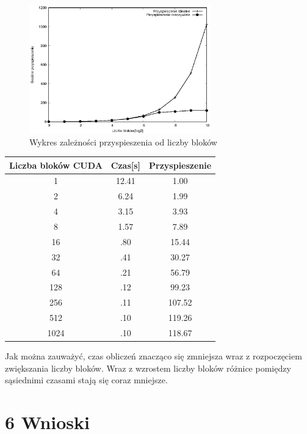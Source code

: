 \documentclass[a4paper,12pt]{article}
\begin{document}
\begin{figure}[!ht]
	\centering
  \includegraphics[width=0.7\textwidth]{cudaWykresPrzyspieszenie.eps}
  \caption{Wykres zależności przyspieszenia od liczby bloków}
\end{figure}

\newpage
\begin{table}[htb]
\centering
\begin{tabular}{|c|c|c|}\hline
Liczba bloków CUDA & Czas[s] & Przyspieszenie\\\hline 
1 & 12.41 & 1.00\\ \hline 
2 & 6.24 & 1.99\\ \hline 
4 & 3.15 & 3.93\\ \hline 
8 & 1.57 & 7.89\\ \hline 
16 & .80 & 15.44\\ \hline 
32 & .41 & 30.27\\ \hline 
64 & .21 & 56.79\\ \hline 
128 & .12 & 99.23\\ \hline
256 & .11 & 107.52\\ \hline 
512 & .10 & 119.26\\ \hline 
1024 & .10 & 118.67\\ \hline 
\end{tabular}
\end{table}
Jak można zauważyć, czas obliczeń znacząco się zmniejsza wraz z rozpoczęciem zwiększania liczby bloków. Wraz z wzrostem liczby bloków różnice pomiędzy sąsiednimi czasami stają się coraz mniejsze. 

\clearpage
\section*{6 Wnioski}

	
\end{document}
